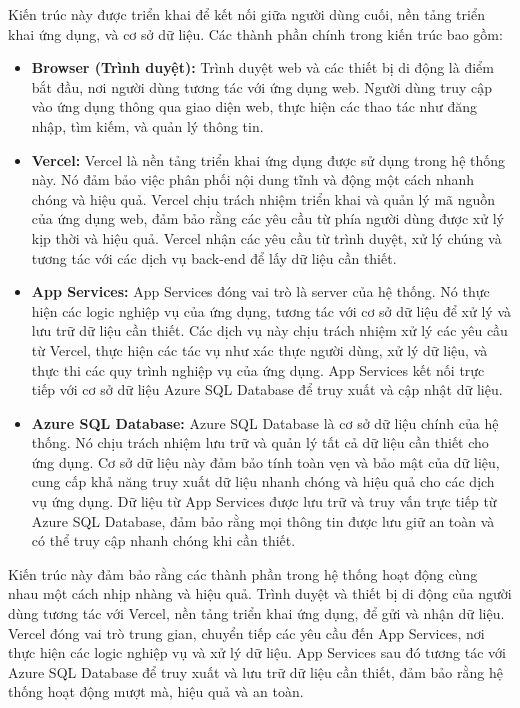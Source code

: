 Kiến trúc này được triển khai để kết nối giữa người dùng cuối, nền tảng triển khai ứng dụng, và cơ sở dữ liệu. Các thành phần chính trong kiến trúc bao gồm:
\begin{itemize}
    \item \textbf{Browser (Trình duyệt):} Trình duyệt web và các thiết bị di động là điểm bắt đầu, nơi người dùng tương tác với ứng dụng web. Người dùng truy cập vào ứng dụng thông qua giao diện web, thực hiện các thao tác như đăng nhập, tìm kiếm, và quản lý thông tin.
    \item \textbf{Vercel:} Vercel là nền tảng triển khai ứng dụng được sử dụng trong hệ thống này. Nó đảm bảo việc phân phối nội dung tĩnh và động một cách nhanh chóng và hiệu quả. Vercel chịu trách nhiệm triển khai và quản lý mã nguồn của ứng dụng web, đảm bảo rằng các yêu cầu từ phía người dùng được xử lý kịp thời và hiệu quả. Vercel nhận các yêu cầu từ trình duyệt, xử lý chúng và tương tác với các dịch vụ back-end để lấy dữ liệu cần thiết.
    \item \textbf{App Services:} App Services đóng vai trò là server của hệ thống. Nó thực hiện các logic nghiệp vụ của ứng dụng, tương tác với cơ sở dữ liệu để xử lý và lưu trữ dữ liệu cần thiết. Các dịch vụ này chịu trách nhiệm xử lý các yêu cầu từ Vercel, thực hiện các tác vụ như xác thực người dùng, xử lý dữ liệu, và thực thi các quy trình nghiệp vụ của ứng dụng. App Services kết nối trực tiếp với cơ sở dữ liệu Azure SQL Database để truy xuất và cập nhật dữ liệu.
    \item \textbf{Azure SQL Database:} Azure SQL Database là cơ sở dữ liệu chính của hệ thống. Nó chịu trách nhiệm lưu trữ và quản lý tất cả dữ liệu cần thiết cho ứng dụng. Cơ sở dữ liệu này đảm bảo tính toàn vẹn và bảo mật của dữ liệu, cung cấp khả năng truy xuất dữ liệu nhanh chóng và hiệu quả cho các dịch vụ ứng dụng. Dữ liệu từ App Services được lưu trữ và truy vấn trực tiếp từ Azure SQL Database, đảm bảo rằng mọi thông tin được lưu giữ an toàn và có thể truy cập nhanh chóng khi cần thiết.
    
\end{itemize}

Kiến trúc này đảm bảo rằng các thành phần trong hệ thống hoạt động cùng nhau một cách nhịp nhàng và hiệu quả. Trình duyệt và thiết bị di động của người dùng tương tác với Vercel, nền tảng triển khai ứng dụng, để gửi và nhận dữ liệu. Vercel đóng vai trò trung gian, chuyển tiếp các yêu cầu đến App Services, nơi thực hiện các logic nghiệp vụ và xử lý dữ liệu. App Services sau đó tương tác với Azure SQL Database để truy xuất và lưu trữ dữ liệu cần thiết, đảm bảo rằng hệ thống hoạt động mượt mà, hiệu quả và an toàn.\\

